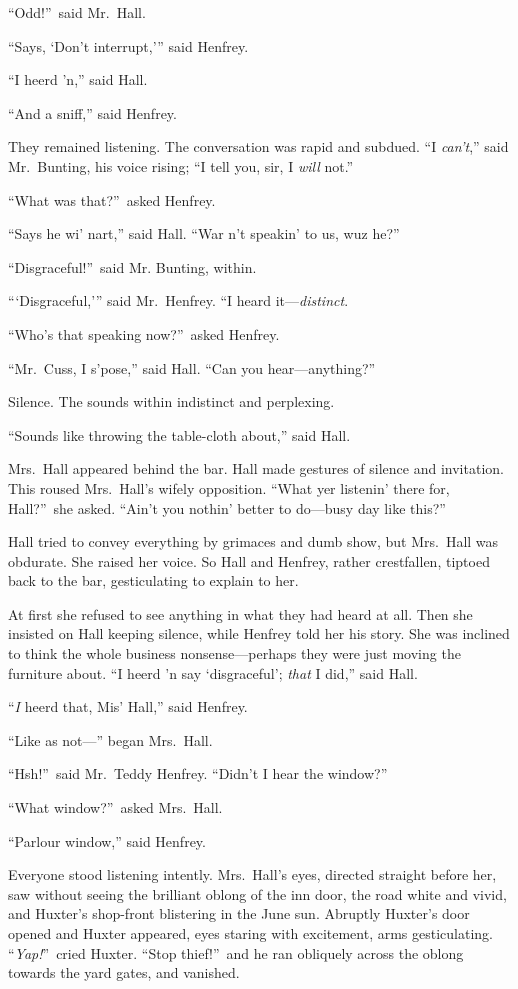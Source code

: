 “Odd!”\ said Mr.\ Hall.

“Says, ‘Don’t interrupt,’\kern1pt” said Henfrey.

“I heerd ’n,” said Hall.

“And a sniff,” said Henfrey.

They remained listening. The conversation was rapid and subdued. “I \emph{can’t},” said Mr.\ Bunting, his voice rising; “I tell you, sir, I \emph{will} not.”

“What was that?”\ asked Henfrey.

{“Says he wi’ nart,” said Hall. “War n’t speakin’ to us, wuz he?”}

“Disgraceful!”\ said Mr. Bunting, within.

“\kern1pt‘Disgraceful,’\kern1pt” said Mr.\ Henfrey. “I heard it—\emph{distinct}.

“Who’s that speaking now?”\ asked Henfrey.

“Mr.\ Cuss, I s’pose,” said Hall. “Can you hear—anything?”

Silence. The sounds within indistinct and perplexing.

“Sounds like throwing the table-cloth about,” said Hall.

Mrs.\ Hall appeared behind the bar. Hall made gestures of silence and invitation. This roused Mrs.\ Hall’s wifely opposition. “What yer listenin’ there for, Hall?”\ she asked. “Ain’t you nothin’ better to do—busy day like this?”

Hall tried to convey everything by grimaces and dumb show, but Mrs.\ Hall was obdurate. She raised her voice. So Hall and Henfrey, rather crestfallen, tiptoed back to the bar, gesticulating to explain to her.

At first she refused to see anything in what they had heard at all. Then she insisted on Hall keeping silence, while Henfrey told her his story. She was inclined to think the whole business nonsense—perhaps they were just moving the furniture about. “I heerd ’n say ‘disgraceful’; \emph{that} I did,” said Hall.

“\emph{I} heerd that, Mis’ Hall,” said Henfrey.

“Like as not—” began Mrs.\ Hall.

“Hsh!”\ said Mr.\ Teddy Henfrey. “Didn’t I hear the window?”

“What window?”\ asked Mrs.\ Hall.

“Parlour window,” said Henfrey.

Everyone stood listening intently. Mrs.\ Hall’s eyes, directed straight before her, saw without seeing the brilliant oblong of the inn door, the road white and vivid, and Huxter’s shop-front blistering in the June sun. Abruptly Huxter’s door opened and Huxter appeared, eyes staring with excitement, arms gesticulating. “\emph{Yap!}”\ cried Huxter. “Stop thief!”\ and he ran obliquely across the oblong towards the yard gates, and vanished.

